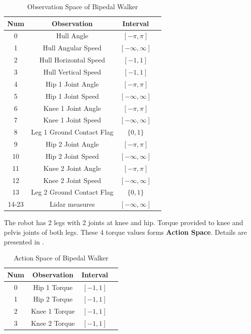 \begin{table}%
	\begin{center}
	\begin{tabular}{cccc}
		\textbf{Num} & \textbf{Observation} & \textbf{Interval} \\
		\hline 
		0  & Hull Angle & $[-\pi,\pi]$ \\
		1  & Hull Angular Speed & $[-\infty,\infty]$ \\
		2  & Hull Horizontal Speed & $[-1,1]$ \\
		3  & Hull Vertical Speed &$[-1,1]$ \\
		4  & Hip 1 Joint Angle & $[-\pi,\pi]$ \\
		5  & Hip 1 Joint Speed & $[-\infty,\infty]$ \\
		6  & Knee 1 Joint Angle & $[-\pi,\pi]$ \\
		7  & Knee 1 Joint Speed & $[-\infty,\infty]$ \\
		8  & Leg 1 Ground Contact Flag & $\{0,1\}$ \\
		9  & Hip 2 Joint Angle & $[-\pi,\pi]$ \\
		10  & Hip 2 Joint Speed & $[-\infty,\infty]$ \\
		11  & Knee 2 Joint Angle & $[-\pi,\pi]$ \\
		12  & Knee 2 Joint Speed & $[-\infty,\infty]$ \\
		13  & Leg 2 Ground Contact Flag & $\{0,1\}$ \\
		14-23  & Lidar measures  & $[-\infty,\infty]$
	\end{tabular}
	\end{center}
	\caption{Observation Space of Bipedal Walker}
	\label{table:bpw_obs_space}
\end{table}

The robot has 2 legs with 2 joints at knee and hip. Torque provided to knee and pelvis joints of both legs. These 4 torque values forms  \textbf{Action Space}. Details are presented in . 

\begin{table}%
	\begin{center}
		\begin{tabular}{cccc}
			\textbf{Num} & \textbf{Observation} & \textbf{Interval} \\
			\hline
			0  & Hip 1 Torque & $[-1,1]$ \\
			1  & Hip 2 Torque & $[-1,1]$ \\
			2  & Knee 1 Torque & $[-1,1]$ \\
			3  & Knee 2 Torque & $[-1,1]$ \\
		\end{tabular}
	\end{center}
	\caption{Action Space of Bipedal Walker}
	\label{table:bpw_act_space}
\end{table}

